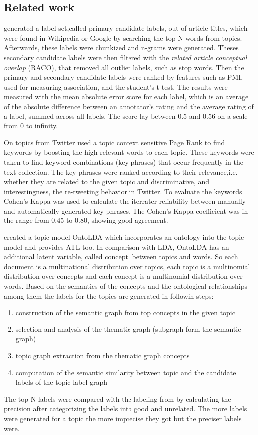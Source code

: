 \subsection{Related work}                                                
\label{sec:relWorl: atl}
\textit{\cite{Lau2011}} generated a label set,called primary candidate labels, out of article titles, which were found in Wikipedia or Google by searching the top N words from topics. Afterwards, these labels were chunkized and n-grams were generated. Theses secondary candidate labels were then filtered with the \textit{related article conceptual overlap} (RACO), that removed all outlier labels, such as stop words. Then the primary and secondary candidate labels were ranked by features such as \ac{PMI}, used for measuring association, and the student’s t test. The results were measured with the mean absolute error score for each label, which is an average of the absolute difference between an annotator’s rating and the average rating of a label, summed across all labels. The score lay between 0.5 and 0.56 on a scale from 0 to infinity.

On topics from Twitter \textit{\cite{Zhao2011}} used  a topic context sensitive Page Rank to find keywords by boosting the high relevant words to each topic. These keywords were taken to find keyword combinations (key phrases) that occur frequently in the text collection. The key phrases were ranked according to their relevance,i.e. whether they are related to the given topic and discriminative, and interestingness, the re-tweeting behavior in Twitter. To evaluate the keywords Cohen’s Kappa was used to calculate the iterrater reliability between manually and automatically generated key phrases. The Cohen’s Kappa coefficient was in the range from 0.45 to 0.80, showing good agreement.

\textit{\cite{Allahyari2015}} created a topic model OntoLDA which incorporates an ontology into the topic model and provides \ac{ATL} too. In comparison with \ac{LDA}, OntoLDA has an additional latent variable, called concept, between topics and words. So each document is a multinational distribution over topics, each topic is a multinomial distribution over concepts and each concept is a multinomial distribution over words.  Based on the semantics of the concepts and the ontological relationships among them the labels for the topics are generated in followin steps:
\begin{enumerate}
	\item construction of the semantic graph from top concepts in the given topic
	\item selection and analysis of the thematic graph (subgraph form the semantic graph)
	\item topic graph extraction from the thematic graph concepts
	\item computation of the semantic similarity between topic and the candidate labels of the topic label graph
\end{enumerate}
The top N labels were compared with the labeling from \textit{\cite{Mei2007}} by calculating the precision after categorizing the labels into good and unrelated. The more labels were generated for a topic the more imprecise they got but the preciser \textit{\cite{Mei2007}} labels were.

